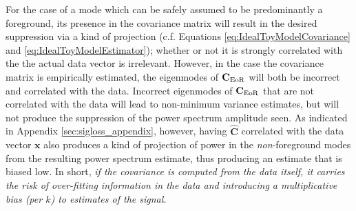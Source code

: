 \documentclass[preprint2,numberedappendix,tighten]{aastex6}  %
\begin{document}
For the case of a mode which can be safely assumed to be predominantly a foreground, its presence in the covariance matrix will result in the desired suppression via a kind of projection (c.f. Equations \ref{eq:IdealToyModelCovariance} and \ref{eq:IdealToyModelEstimator});  whether or not it is strongly correlated with the the actual data vector is irrelevant.  However, in the case the covariance matrix is empirically estimated, the eigenmodes of $\textbf{C}_{\rm EoR}$ will both be incorrect and correlated with the data.  Incorrect eigenmodes of $\textbf{C}_{\rm EoR}$ that are not correlated with the data will lead to non-minimum variance estimates, but will not produce the suppression of the power spectrum amplitude seen.  As indicated in Appendix \ref{sec:sigloss_appendix}, however, having $\widehat{\mathbf{C}}$ correlated with the data vector $\mathbf{x}$ also produces a kind of projection of power in the {\it non}-foreground modes from the resulting power spectrum estimate, thus producing an estimate that is biased low.  In short, {\it if the covariance is computed from the data itself, it carries the risk of over-fitting information in the data and introducing a multiplicative bias (per $k$) to estimates of the signal.} 


%
\end{document}
